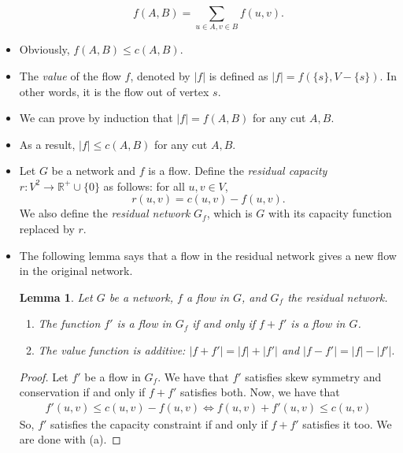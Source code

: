 \documentclass[10pt]{article}
\newtheorem{lemma}{Lemma}[section]
\begin{document}
\begin{itemize}
        $$f(A,B) = \sum_{u \in A, v \in B} f(u,v).$$
      \item Obviously, $f(A,B) \leq c(A,B).$
      \item The \emph{value} of the flow $f$, denoted by $|f|$ is 
        defined as $|f| = f( \{ s \}, V - \{ s \} ).$
        In other words, it is the flow out of vertex $s$.
      \item We can prove by induction that $|f| = f(A,B)$ for any cut $A, B$.
      \item As a result, $|f| \leq c(A,B)$ for any cut $A, B$.
      \item Let $G$ be a network and $f$ is a flow. 
        Define the \emph{residual capacity} $r: V^2 \rightarrow \mathbb{R}^+ \cup \{ 0 \}$ as follows:
        for all $u,v \in V$, $$r(u,v) = c(u,v) - f(u,v).$$
        We also define the \emph{residual network} $G_f$, which is $G$
        with its capacity function replaced by $r$.
      \item The following lemma says that a flow in the residual network
        gives a new flow in the original network.
        
        \begin{lemma}
          Let $G$ be a network, $f$ a flow in $G$, and
          $G_f$ the residual network.
          \renewcommand{\labelenumi}{(\alph{enumi})}
          \begin{enumerate}
            \item The function $f'$ is a flow in $G_f$ if and only if $f + f'$ is a flow in $G$.
            \item The value function is additive: $|f + f'| = |f| + |f'|$ and $|f - f'| = |f| - |f'|.$
          \end{enumerate}
        \end{lemma}
        
        \begin{proof}
          Let $f'$ be a flow in $G_f$. We have that $f'$ satisfies skew symmetry and conservation
          if and only if $f + f'$ satisfies both. Now, we have that
          \begin{align*}
            f'(u,v) \leq c(u,v) - f(u,v) \iff f(u,v) + f'(u,v) \leq c(u,v)
          \end{align*}
          So, $f'$ satisfies the capacity constraint if and only if $f + f'$ satisfies it too.
          We are done with (a).
          

\end{proof}
\end{itemize}
\end{document}
